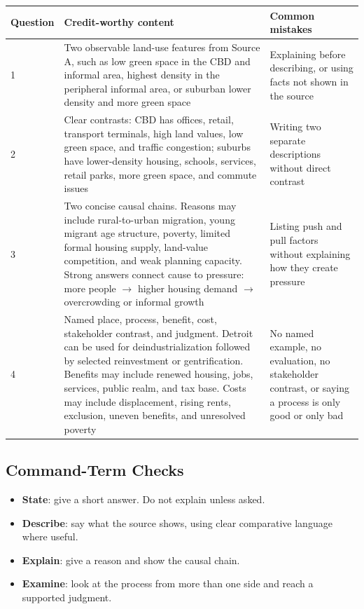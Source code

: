 \documentclass[11pt,a4paper]{article}
\newcommand{\exam}[1]{\textcolor{AccentTeal}{\textbf{#1}}}
\begin{document}
\begin{tabularx}{\textwidth}{L{0.13\textwidth}Y Y}
\toprule
\textbf{Question} & \textbf{Credit-worthy content} & \textbf{Common mistakes} \\
 & Two observable land-use features from Source A, such as low green space in
the CBD and informal area, highest density in the peripheral informal area, or
suburban lower density and more green space & Explaining before describing, or
using facts not shown in the source \\
2 & Clear contrasts: CBD has offices, retail, transport terminals, high land
values, low green space, and traffic congestion; suburbs have lower-density
housing, schools, services, retail parks, more green space, and commute issues &
Writing two separate descriptions without direct contrast \\
3 & Two concise causal chains. Reasons may include rural-to-urban migration,
young migrant age structure, poverty, limited formal housing supply, land-value
competition, and weak planning capacity. Strong answers connect cause to
pressure: more people $\rightarrow$ higher housing demand $\rightarrow$
overcrowding or informal growth & Listing push and pull factors without
explaining how they create pressure \\
4 & Named place, process, benefit, cost, stakeholder contrast, and judgment.
Detroit can be used for deindustrialization followed by selected reinvestment
or gentrification. Benefits may include renewed housing, jobs, services, public
realm, and tax base. Costs may include displacement, rising rents, exclusion,
uneven benefits, and unresolved poverty & No named example, no evaluation, no
stakeholder contrast, or saying a process is only good or only bad \\
\bottomrule
\end{tabularx}

\subsection{Command-Term Checks}

\begin{itemize}
  \item \exam{State}: give a short answer. Do not explain unless asked.
  \item \exam{Describe}: say what the source shows, using clear comparative
  language where useful.
  \item \exam{Explain}: give a reason and show the causal chain.
  \item \exam{Examine}: look at the process from more than one side and reach a
  supported judgment.
\end{itemize}
\end{document}
